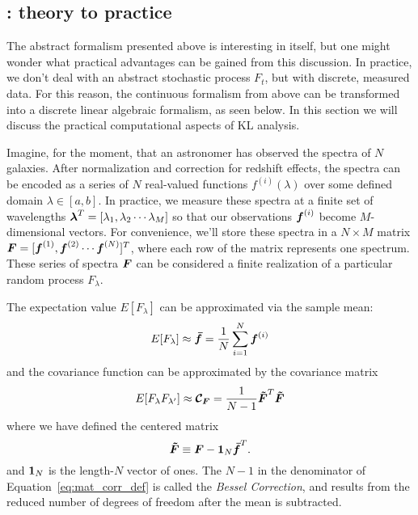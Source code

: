 \subsection{\KL: theory to practice}
\label{sec:KL_practice}
The abstract formalism presented above is interesting in itself, but one
might wonder what practical advantages can be gained from this discussion.
In practice, we don't deal with an abstract stochastic process $F_t$, but
with discrete, measured data.  For this reason, the continuous formalism
from above can be transformed into a discrete linear algebraic formalism,
as seen below.  In this section we will discuss the
practical computational aspects of KL analysis.

Imagine, for the moment, that an astronomer has observed the spectra of
$N$ galaxies.  After normalization and correction for redshift effects,
the spectra can be encoded as a series of $N$ real-valued functions
$f^{(i)}(\lambda)$ over some defined domain $\lambda \in [a, b]$.
In practice, we measure these spectra at a finite set of wavelengths
$\boldsymbol{\lambda}^T = [\lambda_1, \lambda_2 \cdots \lambda_M]$ so that
our observations $\boldsymbol{f}^{(i)}$ become $M$-dimensional vectors.  For
convenience, we'll store these spectra in a $N \times M$ matrix
$\boldsymbol{F} = [\boldsymbol{f}^{(1)}, \boldsymbol{f}^{(2)} \cdots \boldsymbol{f}^{(N)}]^T$,
where each row of the matrix represents one spectrum.
These series of spectra $\boldsymbol{F}$ 
can be considered a finite realization of a particular
random process $F_\lambda$.

The expectation value $E[F_\lambda]$ can be approximated via the sample mean:
\begin{equation}
  E[F_\lambda] \approx \boldsymbol{\bar{f}}
  = \frac{1}{N} \sum_{i=1}^N \boldsymbol{f}^{(i)}
\end{equation}
and the covariance function can be approximated by the covariance matrix
\begin{equation}
  \label{eq:mat_corr_def}
  E[F_\lambda F_{\lambda^\prime}] \approx 
  \boldsymbol{\mathcal{C}_F} = \frac{1}{N - 1} \boldsymbol{\tilde{F}}^T \boldsymbol{\tilde{F}}
\end{equation}
where we have defined the centered matrix
\begin{equation}
  \boldsymbol{\tilde{F}} \equiv \boldsymbol{F} - \boldsymbol{1}_N\boldsymbol{\bar{f}}^T.
\end{equation}
and $\boldsymbol{1}_N$ is the length-$N$ vector of ones.  The $N-1$ in the
denominator of Equation~\ref{eq:mat_corr_def} is called the
{\it Bessel Correction}, and results from the reduced number of degrees of
freedom after the mean is subtracted.

